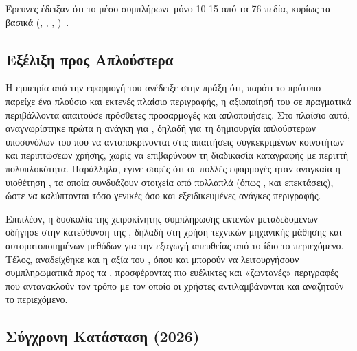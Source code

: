 

Έρευνες έδειξαν ότι το μέσο   συμπλήρωνε μόνο 10-15 από τα 76 πεδία, κυρίως τα βασικά (, , ,  )~\cite{barker2005metadata_practice}.

\subsection{Εξέλιξη προς Απλούστερα }
\label{subsec:metadata_evolution}

Η εμπειρία από την εφαρμογή του  ανέδειξε στην πράξη ότι, παρότι το πρότυπο παρείχε ένα πλούσιο και εκτενές πλαίσιο περιγραφής, η αξιοποίησή του σε πραγματικά περιβάλλοντα απαιτούσε πρόσθετες προσαρμογές και απλοποιήσεις. Στο πλαίσιο αυτό, αναγνωρίστηκε πρώτα η ανάγκη για , δηλαδή για τη δημιουργία απλούστερων υποσυνόλων του  που να ανταποκρίνονται στις απαιτήσεις συγκεκριμένων κοινοτήτων και περιπτώσεων χρήσης, χωρίς να επιβαρύνουν τη διαδικασία καταγραφής με περιττή πολυπλοκότητα. Παράλληλα, έγινε σαφές ότι σε πολλές εφαρμογές ήταν αναγκαία η υιοθέτηση , τα οποία συνδυάζουν στοιχεία από πολλαπλά  (όπως ,  και  επεκτάσεις), ώστε να καλύπτονται τόσο γενικές όσο και εξειδικευμένες ανάγκες περιγραφής.

Επιπλέον, η δυσκολία της χειροκίνητης συμπλήρωσης εκτενών μεταδεδομένων οδήγησε στην κατεύθυνση της , δηλαδή στη χρήση τεχνικών μηχανικής μάθησης και αυτοματοποιημένων μεθόδων για την εξαγωγή  απευθείας από το ίδιο το περιεχόμενο. Τέλος, αναδείχθηκε και η αξία του , όπου  και  μπορούν να λειτουργήσουν συμπληρωματικά προς τα , προσφέροντας πιο ευέλικτες και «ζωντανές» περιγραφές που αντανακλούν τον τρόπο με τον οποίο οι χρήστες αντιλαμβάνονται και αναζητούν το περιεχόμενο.

\subsection{Σύγχρονη Κατάσταση   (2026)}
\label{subsec:metadata_modern}

